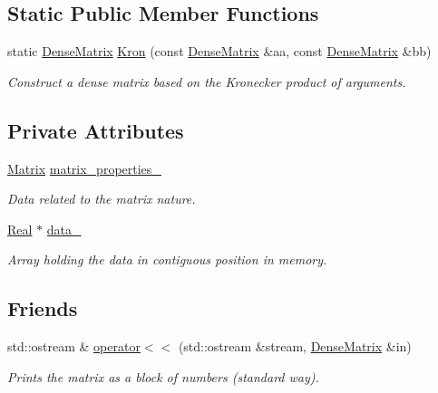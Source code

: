 \subsection*{Static Public Member Functions}
\begin{DoxyCompactItemize}
\item 
static \hyperlink{classmtk_1_1DenseMatrix}{Dense\+Matrix} \hyperlink{classmtk_1_1DenseMatrix_a01d3d8bd502870f93bf3a88a0cc5fb49}{Kron} (const \hyperlink{classmtk_1_1DenseMatrix}{Dense\+Matrix} \&aa, const \hyperlink{classmtk_1_1DenseMatrix}{Dense\+Matrix} \&bb)
\begin{DoxyCompactList}\small\item\em Construct a dense matrix based on the Kronecker product of arguments. \end{DoxyCompactList}\end{DoxyCompactItemize}
\subsection*{Private Attributes}
\begin{DoxyCompactItemize}
\item 
\hyperlink{classmtk_1_1Matrix}{Matrix} \hyperlink{classmtk_1_1DenseMatrix_a481c8d09af685a5ba67acefdcaa810cc}{matrix\+\_\+properties\+\_\+}
\begin{DoxyCompactList}\small\item\em Data related to the matrix nature. \end{DoxyCompactList}\item 
\hyperlink{group__c01-roots_gac080bbbf5cbb5502c9f00405f894857d}{Real} $\ast$ \hyperlink{classmtk_1_1DenseMatrix_a7893e4e5c8d2e2de32b156177e78cb6f}{data\+\_\+}
\begin{DoxyCompactList}\small\item\em Array holding the data in contiguous position in memory. \end{DoxyCompactList}\end{DoxyCompactItemize}
\subsection*{Friends}
\begin{DoxyCompactItemize}
\item 
std\+::ostream \& \hyperlink{classmtk_1_1DenseMatrix_adbcc850ef373550f634f563573a31d28}{operator$<$$<$} (std\+::ostream \&stream, \hyperlink{classmtk_1_1DenseMatrix}{Dense\+Matrix} \&in)
\begin{DoxyCompactList}\small\item\em Prints the matrix as a block of numbers (standard way). \end{DoxyCompactList}\end{DoxyCompactItemize}


